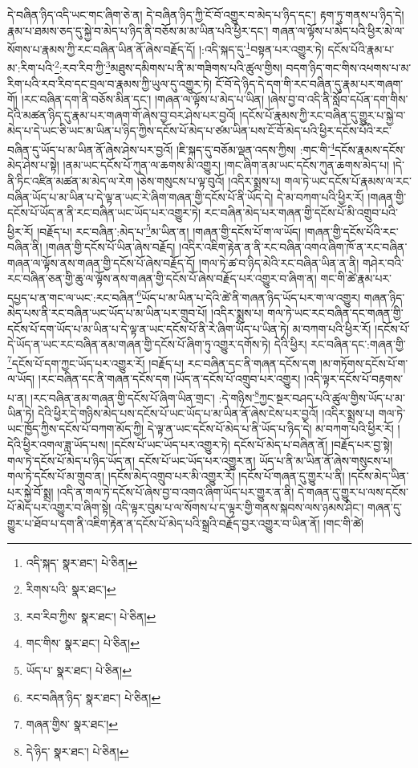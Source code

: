 དེ་བཞིན་ཉིད་འདི་ཡང་གང་ཞིག་ཅེ་ན། དེ་བཞིན་ཉིད་ཀྱི་ངོ་བོ་འགྱུར་བ་མེད་པ་ཉིད་དང་། རྟག་ཏུ་གནས་པ་ཉིད་དེ། རྣམ་པ་ཐམས་ཅད་དུ་སྐྱེ་བ་མེད་པ་ཉིད་ནི་བཅོས་མ་མ་ཡིན་པའི་ཕྱིར་དང་། གཞན་ལ་ལྟོས་པ་མེད་པའི་ཕྱིར་མེ་ལ་སོགས་པ་རྣམས་ཀྱི་རང་བཞིན་ཡིན་ནོ་ཞེས་བརྗོད་དོ། །:འདི་སྐད་དུ་\footnote{འདི་སྐད་  སྣར་ཐང་།  པེ་ཅིན། }བསྟན་པར་འགྱུར་ཏེ། དངོས་པོའི་རྣམ་པ་མ་:རིག་པའི་\footnote{རིགས་པའི་  སྣར་ཐང་། }:རབ་རིབ་ཀྱི་\footnote{རབ་རིབ་ཀྱིས་  སྣར་ཐང་།  པེ་ཅིན། }མཐུས་དམིགས་པ་ནི་མ་གཟིགས་པའི་ཚུལ་གྱིས། བདག་ཉིད་གང་གིས་འཕགས་པ་མ་རིག་པའི་རབ་རིབ་དང་བྲལ་བ་རྣམས་ཀྱི་ཡུལ་དུ་འགྱུར་ཏེ། ངོ་བོ་དེ་ཉིད་དེ་དག་གི་རང་བཞིན་དུ་རྣམ་པར་གཞག་གོ། །རང་བཞིན་དག་ནི་བཅོས་མིན་དང་། །གཞན་ལ་ལྟོས་པ་མེད་པ་ཡིན། །ཞེས་བྱ་བ་འདི་ནི་སློབ་དཔོན་དག་གིས་དེའི་མཚན་ཉིད་དུ་རྣམ་པར་གཞག་གོ་ཞེས་བྱ་བར་ཤེས་པར་བྱའོ། །དངོས་པོ་རྣམས་ཀྱི་རང་བཞིན་དུ་གྱུར་པ་སྐྱེ་བ་མེད་པ་དེ་ཡང་ཅི་ཡང་མ་ཡིན་པ་ཉིད་ཀྱིས་དངོས་པོ་མེད་པ་ཙམ་ཡིན་པས་ངོ་བོ་མེད་པའི་ཕྱིར་དངོས་པོའི་རང་བཞིན་དུ་ཡོད་པ་མ་ཡིན་ནོ་ཞེས་ཤེས་པར་བྱའོ། །ཇི་སྐད་དུ་བཅོམ་ལྡན་འདས་ཀྱིས། :གང་གི་\footnote{གང་གིས་  སྣར་ཐང་།  པེ་ཅིན། }དངོས་རྣམས་དངོས་མེད་ཤེས་པ་སྟེ། །ནམ་ཡང་དངོས་པོ་ཀུན་ལ་ཆགས་མི་འགྱུར། །གང་ཞིག་ནམ་ཡང་དངོས་ཀུན་ཆགས་མེད་པ། །དེ་ནི་ཏིང་འཛིན་མཚན་མ་མེད་ལ་རེག །ཅེས་གསུངས་པ་ལྟ་བུའོ། །འདིར་སྨྲས་པ། གལ་ཏེ་ཡང་དངོས་པོ་རྣམས་ལ་རང་བཞིན་ཡོད་པ་མ་ཡིན་པ་དེ་ལྟ་ན་ཡང་རེ་ཞིག་གཞན་གྱི་དངོས་པོ་ནི་ཡོད་དེ། དེ་མ་བཀག་པའི་ཕྱིར་རོ། །གཞན་གྱི་དངོས་པོ་ཡོད་ན་ནི་རང་བཞིན་ཡང་ཡོད་པར་འགྱུར་ཏེ། རང་བཞིན་མེད་པར་གཞན་གྱི་དངོས་པོ་མི་འགྲུབ་པའི་ཕྱིར་རོ། །བརྗོད་པ། རང་བཞིན་:མེད་པ་\footnote{ཡོད་པ་  སྣར་ཐང་།  པེ་ཅིན། }མ་ཡིན་ན། །གཞན་གྱི་དངོས་པོ་ག་ལ་ཡོད། །གཞན་གྱི་དངོས་པོའི་རང་བཞིན་ནི། །གཞན་གྱི་དངོས་པོ་ཡིན་ཞེས་བརྗོད། །འདིར་འཇིག་རྟེན་ན་ནི་རང་བཞིན་འགའ་ཞིག་ཁོ་ན་རང་བཞིན་གཞན་ལ་ལྟོས་ནས་གཞན་གྱི་དངོས་པོ་ཞེས་བརྗོད་དོ། །གལ་ཏེ་ཚ་བ་ཉིད་མེའི་རང་བཞིན་ཡིན་ན་ནི། གཤེར་བའི་རང་བཞིན་ཅན་གྱི་ཆུ་ལ་ལྟོས་ནས་གཞན་གྱི་དངོས་པོ་ཞེས་བརྗོད་པར་འགྱུར་བ་ཞིག་ན། གང་གི་ཚེ་རྣམ་པར་དཔྱད་པ་ན་གང་ལ་ཡང་:རང་བཞིན་\footnote{རང་བཞིན་ཉིད་  སྣར་ཐང་།  པེ་ཅིན། }ཡོད་པ་མ་ཡིན་པ་དེའི་ཚེ་ནི་གཞན་ཉིད་ཡོད་པར་ག་ལ་འགྱུར། གཞན་ཉིད་མེད་པས་ནི་རང་བཞིན་ཡང་ཡོད་པ་མ་ཡིན་པར་གྲུབ་པོ། །འདིར་སྨྲས་པ། གལ་ཏེ་ཡང་རང་བཞིན་དང་གཞན་གྱི་དངོས་པོ་དག་ཡོད་པ་མ་ཡིན་པ་དེ་ལྟ་ན་ཡང་དངོས་པོ་ནི་རེ་ཞིག་ཡོད་པ་ཡིན་ཏེ། མ་བཀག་པའི་ཕྱིར་རོ། །དངོས་པོ་དེ་ཡོད་ན་ཡང་རང་བཞིན་ནམ་གཞན་གྱི་དངོས་པོ་ཞིག་ཏུ་འགྱུར་དགོས་ཏེ། དེའི་ཕྱིར། རང་བཞིན་དང་:གཞན་གྱི་\footnote{གཞན་གྱིས་  སྣར་ཐང་། }དངོས་པོ་དག་ཀྱང་ཡོད་པར་འགྱུར་རོ། །བརྗོད་པ། རང་བཞིན་དང་ནི་གཞན་དངོས་དག །མ་གཏོགས་དངོས་པོ་ག་ལ་ཡོད། །རང་བཞིན་དང་ནི་གཞན་དངོས་དག །ཡོད་ན་དངོས་པོ་འགྲུབ་པར་འགྱུར། །འདི་ལྟར་དངོས་པོ་བརྟགས་པ་ན། །རང་བཞིན་ནམ་གཞན་གྱི་དངོས་པོ་ཞིག་ཡིན་གྲང་། :དེ་གཉིས་\footnote{དེ་ཉིད་  སྣར་ཐང་།  པེ་ཅིན། }ཀྱང་སྔར་བཤད་པའི་ཚུལ་གྱིས་ཡོད་པ་མ་ཡིན་ཏེ། དེའི་ཕྱིར་དེ་གཉིས་མེད་པས་དངོས་པོ་ཡང་ཡོད་པ་མ་ཡིན་ནོ་ཞེས་ངེས་པར་བྱའོ། །འདིར་སྨྲས་པ། གལ་ཏེ་ཡང་ཁྱོད་ཀྱིས་དངོས་པོ་བཀག་མོད་ཀྱི། དེ་ལྟ་ན་ཡང་དངོས་པོ་མེད་པ་ནི་ཡོད་པ་ཉིད་དེ། མ་བཀག་པའི་ཕྱིར་རོ། །དེའི་ཕྱིར་འགལ་ཟླ་ཡོད་པས། །དངོས་པོ་ཡང་ཡོད་པར་འགྱུར་ཏེ། དངོས་པོ་མེད་པ་བཞིན་ནོ། །བརྗོད་པར་བྱ་སྟེ། གལ་ཏེ་དངོས་པོ་མེད་པ་ཉིད་ཡོད་ན། དངོས་པོ་ཡང་ཡོད་པར་འགྱུར་ན། ཡོད་པ་ནི་མ་ཡིན་ནོ་ཞེས་གསུངས་པ། གལ་ཏེ་དངོས་པོ་མ་གྲུབ་ན། །དངོས་མེད་འགྲུབ་པར་མི་འགྱུར་རོ། །དངོས་པོ་གཞན་དུ་གྱུར་པ་ནི། །དངོས་མེད་ཡིན་པར་སྐྱེ་བོ་སྨྲ། །འདི་ན་གལ་ཏེ་དངོས་པོ་ཞེས་བྱ་བ་འགའ་ཞིག་ཡོད་པར་གྱུར་ན་ནི། དེ་གཞན་དུ་གྱུར་པ་ལས་དངོས་པོ་མེད་པར་འགྱུར་བ་ཞིག་སྟེ། འདི་ལྟར་བུམ་པ་ལ་སོགས་པ་ད་ལྟར་གྱི་གནས་སྐབས་ལས་ཉམས་ཤིང་། གཞན་དུ་གྱུར་པ་ཐོབ་པ་དག་ནི་འཇིག་རྟེན་ན་དངོས་པོ་མེད་པའི་སྒྲའི་བརྗོད་བྱར་འགྱུར་བ་ཡིན་ནོ། །གང་གི་ཚེ། 